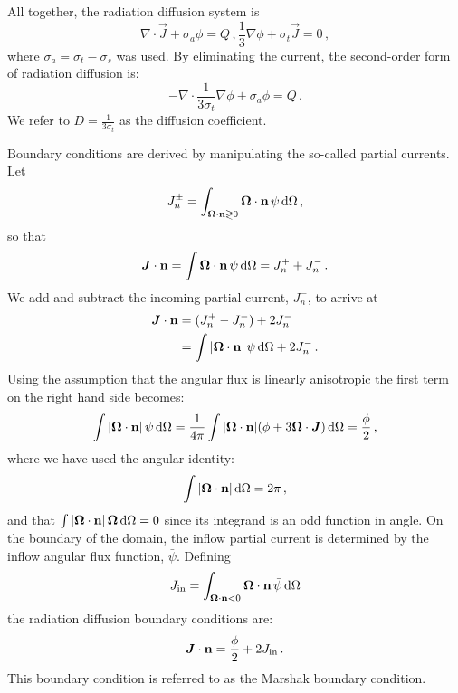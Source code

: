 \documentclass[../doc.tex]{subfiles}
\begin{document}
All together, the radiation diffusion system is 
	\begin{subequations}
	\begin{equation}
		\nabla\cdot\vec{J} + \sigma_a \phi = Q \,, 
	\end{equation}
	\begin{equation}
		\frac{1}{3}\nabla\phi + \sigma_t \vec{J} = 0 \,, 
	\end{equation}
	\end{subequations}
where $\sigma_a = \sigma_t - \sigma_s$ was used. By eliminating the current, the second-order form of radiation diffusion is: 
	\begin{equation}
		-\nabla\cdot \frac{1}{3\sigma_t} \nabla\phi + \sigma_a \phi = Q \,. 
	\end{equation}
We refer to $D = \frac{1}{3\sigma_t}$ as the diffusion coefficient. 

Boundary conditions are derived by manipulating the so-called partial currents. Let 
	\begin{equation}
		J_n^\pm = \int_{\boldsymbol{\Omega}\cdot\boldsymbol{\mathrm{n}}\gtrless 0} \boldsymbol{\Omega}\cdot\boldsymbol{\mathrm{n}}\, \psi \mathop{}\!\mathrm{d} \Omega \,,
	\end{equation}
so that 
	\begin{equation}
		\boldsymbol{J}\cdot\boldsymbol{\mathrm{n}} = \int \boldsymbol{\Omega}\cdot\boldsymbol{\mathrm{n}}\, \psi \mathop{}\!\mathrm{d} \Omega = J_n^+ + J_n^- \,. 
	\end{equation}
We add and subtract the incoming partial current, $J_n^-$, to arrive at 
	\begin{equation}
	\begin{aligned}
		\boldsymbol{J}\cdot\boldsymbol{\mathrm{n}} &= (J_n^+ - J_n^-) + 2J_n^- \\
		&= \int |\boldsymbol{\Omega}\cdot\boldsymbol{\mathrm{n}}|\,\psi \mathop{}\!\mathrm{d} \Omega + 2 J_n^- \,. 
	\end{aligned}
	\end{equation}
Using the assumption that the angular flux is linearly anisotropic the first term on the right hand side becomes: 
	\begin{equation}
		\int |\boldsymbol{\Omega}\cdot\boldsymbol{\mathrm{n}}|\,\psi \mathop{}\!\mathrm{d} \Omega = \frac{1}{4\pi}\int |\boldsymbol{\Omega}\cdot\boldsymbol{\mathrm{n}}| (\phi + 3\boldsymbol{\Omega}\cdot\boldsymbol{J}) \mathop{}\!\mathrm{d} \Omega = \frac{\phi}{2} \,,
	\end{equation}
where we have used the angular identity: 
	\begin{equation}
		\int |\boldsymbol{\Omega}\cdot\boldsymbol{\mathrm{n}}| \mathop{}\!\mathrm{d} \Omega = 2\pi \,, 
	\end{equation}
and that $\int|\boldsymbol{\Omega}\cdot\boldsymbol{\mathrm{n}}|\,\boldsymbol{\Omega}\mathop{}\!\mathrm{d}\Omega = 0$ since its integrand is an odd function in angle. On the boundary of the domain, the inflow partial current is determined by the inflow angular flux function, $\bar{\psi}$. Defining 
	\begin{equation}
		J_\text{in} = \int_{\boldsymbol{\Omega}\cdot\boldsymbol{\mathrm{n}}<0} \boldsymbol{\Omega}\cdot\boldsymbol{\mathrm{n}}\,\bar{\psi} \mathop{}\!\mathrm{d} \Omega 
	\end{equation}
the radiation diffusion boundary conditions are: 
	\begin{equation}
		\boldsymbol{J}\cdot\boldsymbol{\mathrm{n}} = \frac{\phi}{2} + 2J_\text{in} \,. 
	\end{equation}
This boundary condition is referred to as the Marshak boundary condition. 
\end{document}
